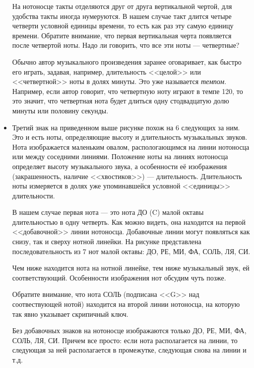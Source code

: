 \begin{itemize}
    На нотоносце такты отделяются друг от друга вертикальной чертой, для удобства такты иногда нумеруются. В нашем случае такт длится четыре четверти условной единицы времени, то есть как раз эту самую единицу времени. Обратите внимание, что первая вертикальная черта появляется после четвертой ноты. Надо ли говорить, что все эти ноты --- четвертные?
    
    Обычно автор музыкального произведения заранее оговаривает, как быстро его играть, задавая, например, длительность <<целой>> или <<четвертной>> ноты в долях минуты. Это уже называется \emph{темпом}. Например, если автор говорит, что четвертную ноту играют в темпе 120, то это значит, что четвертная нота будет длиться одну стодвадцатую долю минуты или половину секунды.
    
    \item Третий знак на приведенном выше рисунке похож на 6 следующих за ним. Это и есть ноты, определяющие высоту и длительность музыкальных звуков. Нота изображается маленьким овалом, распологающимся на линии нотоносца или между соседними линиями. Положение ноты на линиях нотоносца определяет высоту музыкального звука, а особенности её изображения (закрашенность, наличие <<хвостиков>>) --- длительность. Длительность ноты измеряется в долях уже упоминавшейся условной <<единицы>> длительности.
    
    В нашем случае первая нота --- это нота ДО (C) малой октавы длительностью в одну четверть. Как можно видеть, она находится на первой <<добавочной>> линии нотоносца. Добавочные линии могут появляться как снизу, так и сверху нотной линейки. На рисунке представлена последовательность из 7 нот малой октавы: ДО, РЕ, МИ, ФА, СОЛЬ, ЛЯ, СИ.
    
    Чем ниже находится нота на нотной линейке, тем ниже музыкальный звук, ей соответствующий. Особенности изображения нот обсудим чуть позже.
        
    Обратите внимание, что нота СОЛЬ (подписана <<G>> над соотвествующей нотой) находится на второй линии нотоносца, на которую так явно указывает скрипичный ключ.
    
    Без добавочных знаков на нотоносце изображаются только ДО, РЕ, МИ, ФА, СОЛЬ, ЛЯ, СИ. Причем все просто: если нота располагается на линии, то следующая за ней располагается в промежутке, следующая снова на линии и т.д.
\end{itemize}

